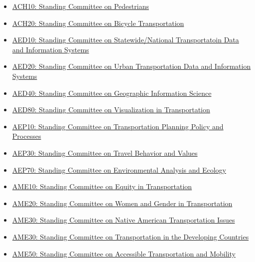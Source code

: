 \documentclass[
]{book}
\providecommand{\tightlist}{%
  \setlength{\itemsep}{0pt}\setlength{\parskip}{0pt}}
\begin{document}
\begin{itemize}
\tightlist
\item
  \href{https://www.mytrb.org/OnlineDirectory/Committee/Details/5158}{ACH10: Standing Committee on Pedestrians}
\item
  \href{https://www.mytrb.org/OnlineDirectory/Committee/Details/5093}{ACH20: Standing Committee on Bicycle Transportation}
\item
  \href{https://www.mytrb.org/OnlineDirectory/Committee/Details/5147}{AED10: Standing Committee on Statewide/National Transportatoin Data and Information Systems}
\item
  \href{https://www.mytrb.org/OnlineDirectory/Committee/Details/5226}{AED20: Standing Committee on Urban Transportation Data and Information Systems}
\item
  \href{https://www.mytrb.org/OnlineDirectory/Committee/Details/5139}{AED40: Standing Committee on Geographic Information Science}
\item
  \href{https://www.mytrb.org/OnlineDirectory/Committee/Details/5113}{AED80: Standing Committee on Visualization in Transportation}
\item
  \href{https://www.mytrb.org/OnlineDirectory/Committee/Details/5127}{AEP10: Standing Committee on Transportation Planning Policy and Processes}
\item
  \href{https://www.mytrb.org/OnlineDirectory/Committee/Details/5209}{AEP30: Standing Committee on Travel Behavior and Values}
\item
  \href{https://www.mytrb.org/OnlineDirectory/Committee/Details/5176}{AEP70: Standing Committee on Environmental Analysis and Ecology}
\item
  \href{https://www.mytrb.org/OnlineDirectory/Committee/Details/5143}{AME10: Standing Committee on Equity in Transportation}
\item
  \href{https://www.mytrb.org/OnlineDirectory/Committee/Details/5162}{AME20: Standing Committee on Women and Gender in Transportation}
\item
  \href{https://www.mytrb.org/OnlineDirectory/Committee/Details/5112}{AME30: Standing Committee on Native American Transportation Issues}
\item
  \href{https://www.mytrb.org/OnlineDirectory/Committee/Details/5114}{AME30: Standing Committee on Transportation in the Developing Countries}
\item
  \href{https://www.mytrb.org/OnlineDirectory/Committee/Details/5123}{AME50: Standing Committee on Accessible Transportation and Mobility}

\end{itemize}
\end{document}
